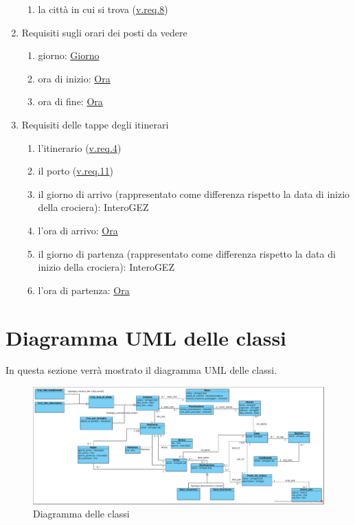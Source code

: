 \documentclass{article}
\begin{document}
\begin{enumerate}
\begin{enumerate}
        \item la città in cui si trova (\hyperref[sec:RequisitiCittà]{v.req.8})\label{sec:RequisitiPortoCittà}
    \end{enumerate}
    \item Requisiti sugli orari dei posti da vedere\label{sec:RequisitiOrarioPostoDaVedere}
    \begin{enumerate}
        \item giorno: \hyperref[sec:Giorno]{Giorno}\label{sec:RequisitiOrarioPostoDaVedereGiorno}
        \item ora di inizio: \hyperref[sec:Ora]{Ora}\label{sec:RequisitiOrarioPostoDaVedereOraDiInizio}
        \item ora di fine: \hyperref[sec:Ora]{Ora}\label{sec:RequisitiOrarioPostoDaVedereOraDiFine}
    \end{enumerate}
    \item Requisiti delle tappe degli itinerari\label{sec:RequisitiTappa}
    \begin{enumerate}
        \item l'itinerario (\hyperref[sec:RequisitiItinerario]{v.req.4})\label{sec:RequisitiTappaItinerario}
        \item il porto (\hyperref[sec:RequisitiPorto]{v.req.11})\label{sec:RequisitiTappaPorto}
        \item il giorno di arrivo (rappresentato come differenza rispetto la data di inizio della crociera): InteroGEZ\label{sec:RequisitiTappaGiornoDiArrivo}
        \item l'ora di arrivo: \hyperref[sec:Ora]{Ora}\label{sec:RequisitiTappaOraDiArrivo}
        \item il giorno di partenza (rappresentato come differenza rispetto la data di inizio della crociera): InteroGEZ\label{sec:RequisitiTappaGiornoDiPartenza}
        \item l'ora di partenza: \hyperref[sec:Ora]{Ora}\label{sec:RequisitiTappaOraDiPartenza}
    \end{enumerate}
\end{enumerate}

\newpage
\section{Diagramma UML delle classi}

In questa sezione verrà mostrato il diagramma UML delle classi.
\begin{figure}[h]
    \centering
    \includegraphics[width=\textwidth]{../Diagramma delle classi.pdf}
    \caption{Diagramma delle classi}
\end{figure}
\end{document}
